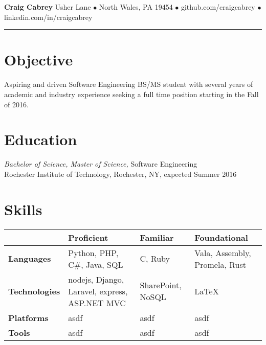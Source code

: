 \documentclass[margin, 10pt]{res}
\newcommand{\fullbar}{\rule{\textwidth}{0.4pt}}
\begin{document}
{\Large\textbf{Craig Cabrey}}
\vspace{0.25cm}
 Usher Lane $\bullet$
North Wales, PA 19454 $\bullet$
github.com/craigcabrey $\bullet$
linkedin.com/in/craigcabrey \vspace{-0.5cm}
\newline
\fullbar
\vspace{-0.5cm}

\begin{resume}

\section{Objective}  

Aspiring and driven Software Engineering BS/MS student with several years of
academic and industry experience seeking a full time position starting in the
Fall of 2016.

\section{Education}

{\sl Bachelor of Science, Master of Science,} Software Engineering \\
Rochester Institute of Technology, Rochester, NY, expected Summer 2016\\
 
\section{Skills} 

{
\small
\renewcommand{\arraystretch}{1.5}
\begin{tabular}{
    >{\arraybackslash}p{2cm}
    >{\arraybackslash}p{4cm}
    >{\arraybackslash}p{3.75cm}
    >{\arraybackslash}p{3.75cm}}
    & \textbf{Proficient} & \textbf{Familiar} & \textbf{Foundational} \\ \hline
  \textbf{Languages} & Python, PHP, C\#, Java, SQL & C, Ruby & Vala, Assembly,
                       Promela, Rust\\ \hline
  \textbf{Technologies} & nodejs, Django, Laravel, express, ASP.NET MVC &
                          SharePoint, NoSQL & \LaTeX \\ \hline
  \textbf{Platforms} & asdf & asdf & asdf \\ \hline
  \textbf{Tools} & asdf & asdf & asdf \\ \hline
\end{tabular}
}


\end{resume}
\end{document}
